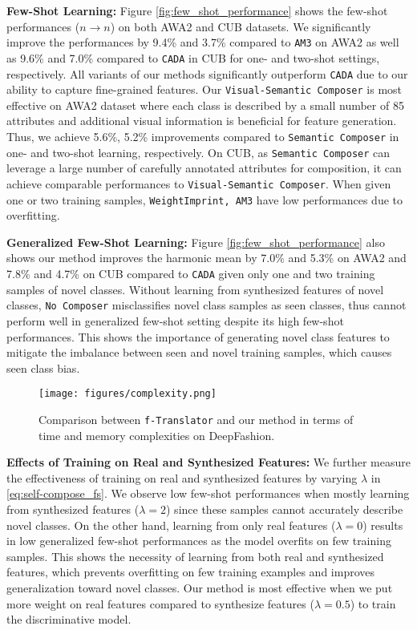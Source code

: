 \documentclass[10pt,journal,compsoc]{IEEEtran}
\newcommand{\1}{\boldsymbol{1}}
\newcommand{\0}{\boldsymbol{0}}
\newcommand{\<}{\langle}
\renewcommand{\>}{\rangle}
\newcommand{\myparagraph}[1]{\vspace{-2pt}\medskip\noindent\textbf{#1}}
\begin{document}
\myparagraph{Few-Shot Learning:}
Figure \ref{fig:few_shot_performance} shows the few-shot performances ($n\rightarrow n$) on both AWA2 and CUB datasets.
We significantly improve the performances by 9.4\% and 3.7\% compared to \texttt{AM3} on AWA2 as well as 9.6\% and 7.0\% compared to \texttt{CADA} in CUB for one- and two-shot settings, respectively.
All variants of our methods significantly outperform \texttt{CADA} due to our ability to capture fine-grained features.
Our \texttt{Visual-Semantic Composer} is most effective on AWA2 dataset where each class is described by a small number of 85 attributes and additional visual information is beneficial for feature generation. 
Thus, we achieve 5.6\%, 5.2\% improvements compared to \texttt{Semantic Composer} in one- and two-shot learning, respectively.
On CUB, as \texttt{Semantic Composer} can leverage a large number of carefully annotated attributes for composition, it can achieve comparable performances to \texttt{Visual-Semantic Composer}.
When given one or two training samples, \texttt{WeightImprint, AM3} have low performances due to overfitting.

\myparagraph{Generalized Few-Shot Learning:}
Figure \ref{fig:few_shot_performance} also shows our method improves the harmonic mean by 7.0\% and 5.3\% on AWA2 and 7.8\% and 4.7\% on CUB compared to \texttt{CADA} given only one and two training samples of novel classes.
Without learning from synthesized features of novel classes, \texttt{No Composer} misclassifies novel class samples as seen classes, thus cannot perform well in generalized few-shot setting despite its high few-shot performances.
This shows the importance of generating novel class features to mitigate the imbalance between seen and novel training samples, which causes seen class bias.

\begin{figure}[t!]
\centering
\texttt{[image: figures/complexity.png]}
\vspace{-0mm}
\caption{
\small{
Comparison between \texttt{f-Translator} and our method in terms of time and memory complexities on DeepFashion.
}
}
\label{fig:complexity}
\end{figure}


\myparagraph{Effects of Training on Real and Synthesized Features:}
We further measure the effectiveness of training on real and synthesized features by varying $\lambda$ in \eqref{eq:self-compose_fs}.
We observe low few-shot performances when mostly learning from synthesized features ($\lambda=2$) since these samples cannot accurately describe novel classes.
On the other hand, learning from only real features ($\lambda=0$) results in low generalized few-shot performances as the model overfits on few training samples.
This shows the necessity of learning from both real and synthesized features, which prevents overfitting on few training examples and improves generalization toward novel classes.
Our method is most effective when we put more weight on real features compared to synthesize features ($\lambda =0.5$) to train the discriminative model.
\end{document}
